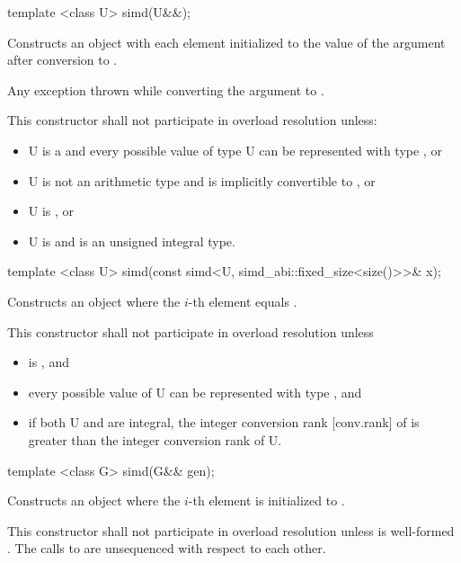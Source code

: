 \begin{itemdecl}
template <class U> simd(U&&);
\end{itemdecl}
\begin{itemdescr}
  \pnum\effects Constructs an object with each element initialized to the value of the argument after conversion to .

  \pnum\throws Any exception thrown while converting the argument to .

  \pnum\remarks This constructor shall not participate in overload resolution unless:
  \begin{itemize}
    \item \type U is a \realArithmeticType and every possible value of type \type U can be represented with type , or
    \item \type U is not an arithmetic type and is implicitly convertible to , or
    \item \type U is \intt, or
    \item \type U is \uint and  is an unsigned integral type.
  \end{itemize}
\end{itemdescr}

\begin{itemdecl}
template <class U> simd(const simd<U, simd_abi::fixed_size<size()>>& x);
\end{itemdecl}
\begin{itemdescr}
  \pnum\effects Constructs an object where the $i$-th element equals  \foralli.

  \pnum\remarks This constructor shall not participate in overload resolution unless
  \begin{itemize}
    \item {} is \fixedsizescoped{}, and
    \item every possible value of \type U can be represented with type , and
    \item if both \type U and  are integral, the integer conversion rank [conv.rank] of  is greater than the integer conversion rank of \type U.
  \end{itemize}
\end{itemdescr}

\begin{itemdecl}
template <class G> simd(G&& gen);
\end{itemdecl}
\begin{itemdescr}
  \pnum\effects Constructs an object where the $i$-th element is initialized to .

  \pnum\remarks This constructor shall not participate in overload resolution unless  is well-formed \foralli.
  The calls to  are unsequenced with respect to each other.
\end{itemdescr}

